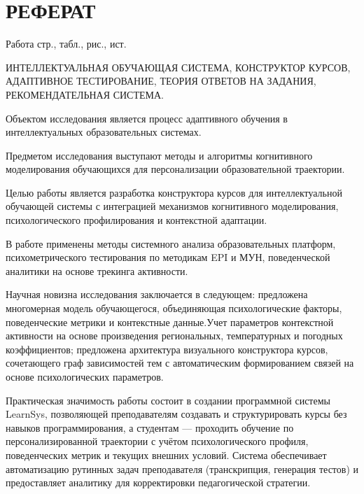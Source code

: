 \documentclass[a4paper,12pt]{article}
\begin{document}


\setcounter{page}{2}


\section*{\centering РЕФЕРАТ}

Работа  стр.,  табл.,  рис., \totalmycitecounts ист. 

ИНТЕЛЛЕКТУАЛЬНАЯ ОБУЧАЮЩАЯ СИСТЕМА, КОНСТРУКТОР КУРСОВ, 
АДАПТИВНОЕ ТЕСТИРОВАНИЕ, ТЕОРИЯ ОТВЕТОВ НА ЗАДАНИЯ, 
РЕКОМЕНДАТЕЛЬНАЯ СИСТЕМА.

Объектом исследования является процесс адаптивного обучения в 
интеллектуальных образовательных системах. 

Предметом исследования выступают методы и алгоритмы когнитивного 
моделирования обучающихся для персонализации образовательной траектории.

Целью работы является разработка конструктора курсов для интеллектуальной 
обучающей системы с интеграцией механизмов когнитивного моделирования, 
психологического профилирования и контекстной адаптации.

В работе применены методы системного анализа образовательных платформ, психометрического 
тестирования по методикам EPI и МУН, поведенческой аналитики на основе трекинга 
активности.

Научная новизна исследования заключается в следующем: предложена многомерная 
модель обучающегося, объединяющая психологические факторы, 
поведенческие метрики и контекстные данные.Учет параметров контекстной активности 
на основе произведения региональных, температурных и погодных коэффициентов; 
предложена архитектура визуального конструктора курсов, сочетающего граф 
зависимостей тем с автоматическим формированием связей на основе психологических 
параметров.

Практическая значимость работы состоит в создании программной системы LearnSys, 
позволяющей преподавателям создавать и структурировать курсы без навыков 
программирования, а студентам --- проходить обучение по персонализированной 
траектории с учётом психологического профиля, поведенческих метрик и текущих 
внешних условий. Система обеспечивает автоматизацию рутинных задач преподавателя 
(транскрипция, генерация тестов) и предоставляет 
аналитику для корректировки педагогической стратегии.
\end{document}
